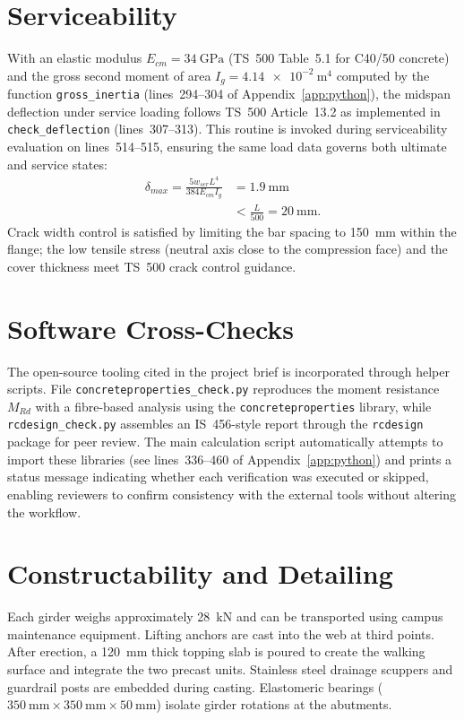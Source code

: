 \documentclass[12pt,a4paper]{report}
\newenvironment{calculation}{\begin{equation}\begin{aligned}}{\end{aligned}\end{equation}}
\begin{document}
\section{Serviceability}
With an elastic modulus $E_{cm}=\SI{34}{\giga\pascal}$ (TS~500 Table~5.1 for C40/50 concrete) and the gross second moment of area $I_g = \SI{4.14e-2}{\meter^4}$ computed by the function \texttt{gross\_inertia} (lines~294--304 of Appendix~\ref{app:python}), the midspan deflection under service loading follows TS~500 Article~13.2 as implemented in \texttt{check\_deflection} (lines~307--313). This routine is invoked during serviceability evaluation on lines~514--515, ensuring the same load data governs both ultimate and service states:
\begin{calculation}
\delta_{max} = \frac{5 w_{ser} L^4}{384 E_{cm} I_g} &= \SI{1.9}{\milli\meter} \\
&< \frac{L}{500} = \SI{20}{\milli\meter}.
\end{calculation}
Crack width control is satisfied by limiting the bar spacing to \SI{150}{\milli\meter} within the flange; the low tensile stress (neutral axis close to the compression face) and the cover thickness meet TS~500 crack control guidance.

\section{Software Cross-Checks}\label{sec:software}

The open-source tooling cited in the project brief is incorporated through helper scripts. File \texttt{concreteproperties\_check.py} reproduces the moment resistance $M_{Rd}$ with a fibre-based analysis using the \texttt{concreteproperties} library, while \texttt{rcdesign\_check.py} assembles an IS~456-style report through the \texttt{rcdesign} package for peer review. The main calculation script automatically attempts to import these libraries (see lines~336--460 of Appendix~\ref{app:python}) and prints a status message indicating whether each verification was executed or skipped, enabling reviewers to confirm consistency with the external tools without altering the workflow.

\section{Constructability and Detailing}
Each girder weighs approximately \SI{28}{\kilo\newton} and can be transported using campus maintenance equipment. Lifting anchors are cast into the web at third points. After erection, a \SI{120}{\milli\meter} thick topping slab is poured to create the walking surface and integrate the two precast units. Stainless steel drainage scuppers and guardrail posts are embedded during casting. Elastomeric bearings ($\SI{350}{\milli\meter}\times\SI{350}{\milli\meter}\times\SI{50}{\milli\meter}$) isolate girder rotations at the abutments.
\end{document}
